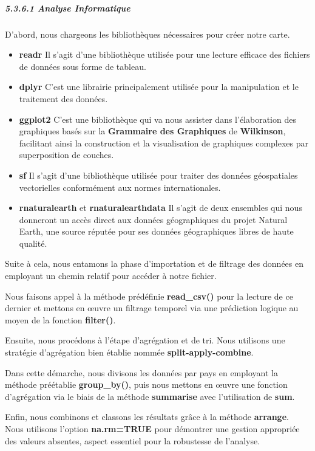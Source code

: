\documentclass[
]{article}
\begin{document}
\subparagraph{5.3.6.1 Analyse Informatique}\label{analyse-informatique}

D'abord, nous chargeons les bibliothèques nécessaires pour créer notre
carte.

\begin{itemize}
\item
  \textbf{readr} Il s'agit d'une bibliothèque utilisée pour une lecture
  efficace des fichiers de données sous forme de tableau.
\item
  \textbf{dplyr} C'est une librairie principalement utilisée pour la
  manipulation et le traitement des données.
\item
  \textbf{ggplot2} C'est une bibliothèque qui va nous assister dans
  l'élaboration des graphiques basés sur la \textbf{Grammaire des
  Graphiques} de \textbf{Wilkinson}, facilitant ainsi la construction et
  la visualisation de graphiques complexes par superposition de couches.
\item
  \textbf{sf} Il s'agit d'une bibliothèque utilisée pour traiter des
  données géospatiales vectorielles conformément aux normes
  internationales.
\item
  \textbf{rnaturalearth} et \textbf{rnaturalearthdata} Il s'agit de deux
  ensembles qui nous donneront un accès direct aux données géographiques
  du projet Natural Earth, une source réputée pour ses données
  géographiques libres de haute qualité.
\end{itemize}

Suite à cela, nous entamons la phase d'importation et de filtrage des
données en employant un chemin relatif pour accéder à notre fichier.

Nous faisons appel à la méthode prédéfinie \textbf{read\_csv()} pour la
lecture de ce dernier et mettons en œuvre un filtrage temporel via une
prédiction logique au moyen de la fonction \textbf{filter()}.

Ensuite, nous procédons à l'étape d'agrégation et de tri. Nous utilisons
une stratégie d'agrégation bien établie nommée
\textbf{split-apply-combine}.

Dans cette démarche, nous divisons les données par pays en employant la
méthode préétablie \textbf{group\_by()}, puis nous mettons en œuvre une
fonction d'agrégation via le biais de la méthode \textbf{summarise} avec
l'utilisation de \textbf{sum}.

Enfin, nous combinons et classons les résultats grâce à la méthode
\textbf{arrange}.\\
Nous utilisons l'option \textbf{na.rm=TRUE} pour démontrer une gestion
appropriée des valeurs absentes, aspect essentiel pour la robustesse de
l'analyse.
\end{document}
